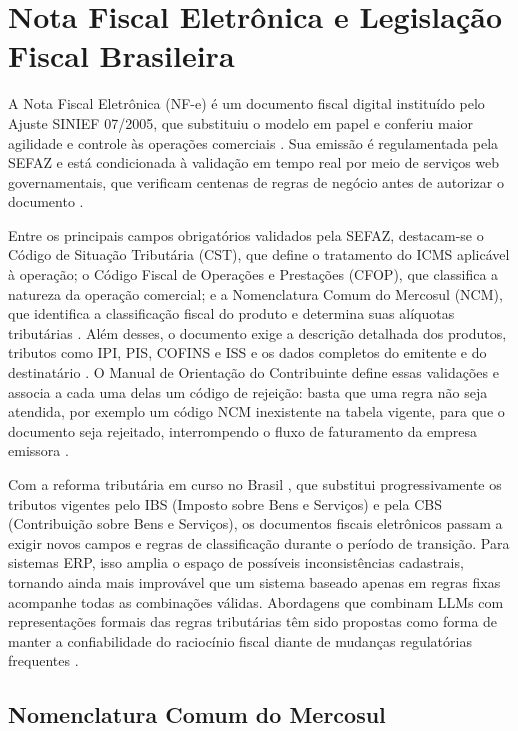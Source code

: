 \section{Nota Fiscal Eletrônica e Legislação Fiscal Brasileira}

A Nota Fiscal Eletrônica (NF-e) é um documento fiscal digital instituído pelo Ajuste SINIEF 07/2005, que substituiu o modelo em papel e conferiu maior agilidade e controle às operações comerciais \cite{sinief2005}. Sua emissão é regulamentada pela SEFAZ e está condicionada à validação em tempo real por meio de serviços web governamentais, que verificam centenas de regras de negócio antes de autorizar o documento \cite{brasil2020moc}.

Entre os principais campos obrigatórios validados pela SEFAZ, destacam-se o Código de Situação Tributária (CST), que define o tratamento do ICMS aplicável à operação; o Código Fiscal de Operações e Prestações (CFOP), que classifica a natureza da operação comercial; e a Nomenclatura Comum do Mercosul (NCM), que identifica a classificação fiscal do produto e determina suas alíquotas tributárias \cite{sefazpe2016}. Além desses, o documento exige a descrição detalhada dos produtos, tributos como IPI, PIS, COFINS e ISS e os dados completos do emitente e do destinatário \cite{brasil2020moc}. O Manual de Orientação do Contribuinte define essas validações e associa a cada uma delas um código de rejeição: basta que uma regra não seja atendida, por exemplo um código NCM inexistente na tabela vigente, para que o documento seja rejeitado, interrompendo o fluxo de faturamento da empresa emissora \cite{brasil2020moc}.

Com a reforma tributária em curso no Brasil \cite{brasil2023ec132}, que substitui progressivamente os tributos vigentes pelo IBS (Imposto sobre Bens e Serviços) e pela CBS (Contribuição sobre Bens e Serviços), os documentos fiscais eletrônicos passam a exigir novos campos e regras de classificação durante o período de transição. Para sistemas ERP, isso amplia o espaço de possíveis inconsistências cadastrais, tornando ainda mais improvável que um sistema baseado apenas em regras fixas acompanhe todas as combinações válidas. Abordagens que combinam LLMs com representações formais das regras tributárias têm sido propostas como forma de manter a confiabilidade do raciocínio fiscal diante de mudanças regulatórias frequentes \cite{Jurayj2025TaxLogic}.

\subsection{Nomenclatura Comum do Mercosul}
\label{sec:ncm}

